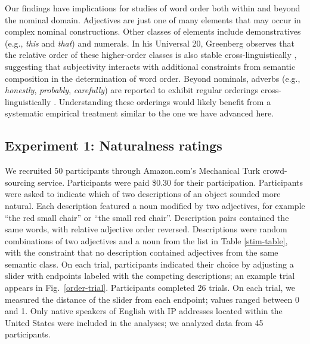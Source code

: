 \documentclass{pnastwo}
\begin{document}
\begin{article}
Our findings have implications for studies of word order both within and beyond the nominal domain. Adjectives are just one of many elements that may occur in complex nominal constructions. Other classes of elements include demonstratives (e.g., \emph{this} and \emph{that}) and numerals. In his Universal 20, Greenberg observes that the relative order of these higher-order classes is also stable cross-linguistically \cite{greenberg1963,culbertsonadger2014}, suggesting that subjectivity interacts with additional constraints from semantic composition in the determination of word order. Beyond nominals, adverbs (e.g., \emph{honestly}, \emph{probably}, \emph{carefully}) are reported to exhibit regular orderings cross-linguistically \cite{cinque1999,ernst2002}. Understanding these orderings would likely benefit from a systematic empirical treatment similar to the one we have advanced here.


\begin{materials}
\section{Experiment 1: Naturalness ratings}	
We recruited 50 participants through Amazon.com's Mechanical Turk crowd-sourcing service. Participants were paid \$0.30 for their participation.
Participants were asked to indicate which of two descriptions of an object sounded more natural. Each description featured a noun modified by two adjectives, for example ``the red small chair'' or ``the small red chair''. Description pairs contained the same words, with relative adjective order reversed. Descriptions were random combinations of two adjectives and a noun from the list in Table \ref{stim-table}, with the constraint that no description contained adjectives from the same semantic class.
On each trial, participants indicated their choice by adjusting a slider with endpoints labeled with the competing descriptions; an example trial appears in Fig.\ \ref{order-trial}. Participants completed 26 trials. On each trial, we measured the distance of the slider from each endpoint; values ranged between 0 and 1. Only native speakers of English with IP addresses located within the United States were included in the analyses; we analyzed data from 45 participants.





\end{materials}
\end{article}
\end{document}
